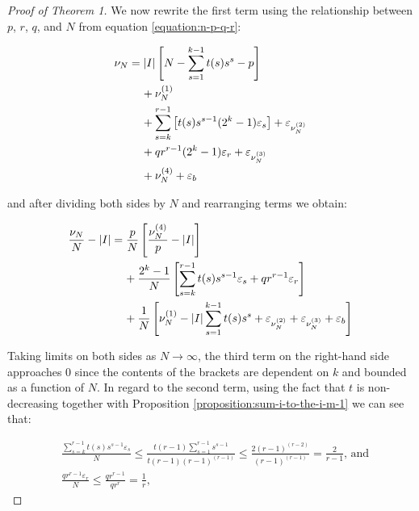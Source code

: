 \documentclass[11pt,a4paper]{tesis}
\theoremstyle{plain}
\theoremstyle{definition}
\begin{document}
\begin{proof}[Proof of Theorem 1]
  We now rewrite the first term using the relationship between $p$, $r$, $q$, and $N$ from equation \ref{equation:n-p-q-r}:

  \begin{equation*}
    \begin{aligned}
      \nu_N
        & = |I| \left[ N - \sum_{s = 1}^{k - 1} t(s) s^s - p \right] \\
        & \hspace*{4mm} + \nu^{(1)}_N \\
        & \hspace*{4mm} + \sum_{s = k}^{r - 1} \left[ t(s) s^{s - 1} (2^k - 1) \varepsilon_s \right] + \varepsilon_{\nu^{(2)}_N} \\
        & \hspace*{4mm} + q r^{r - 1} (2^k - 1) \varepsilon_r  + \varepsilon_{\nu^{(3)}_N} \\
        & \hspace*{4mm} + \nu^{(4)}_N + \varepsilon_b
    \end{aligned}
  \end{equation*}

  and after dividing both sides by $N$ and rearranging terms we obtain:

  \begin{equation*}
    \begin{aligned}
      \frac{\nu_N}{N} - |I|
        & = \frac{p}{N} \left[ \frac{\nu^{(4)}_N}{p} - |I| \right] \\
        & \hspace*{4mm} + \frac{2^k - 1}{N} \left[ \sum_{s = k}^{r - 1} t(s) s^{s - 1} \varepsilon_s + q r^{r - 1} \varepsilon_r \right] \\
        & \hspace*{4mm} + \frac{1}{N} \left[ \nu^{(1)}_N - |I| \sum_{s = 1}^{k - 1} t(s) s^s + \varepsilon_{\nu^{(2)}_N} + \varepsilon_{\nu^{(3)}_N} + \varepsilon_b \right]
    \end{aligned}
  \end{equation*}

  Taking limits on both sides as $N \to \infty$, the third term on the right-hand side approaches $0$ since the contents of the brackets are dependent on $k$ and bounded as a function of $N$. In regard to the second term, using the fact that $t$ is non-decreasing together with Proposition \ref{proposition:sum-i-to-the-i-m-1} we can see that:

  \begin{equation*}
    \begin{aligned}
      & \frac{\sum_{s = k}^{r - 1} t(s) s^{s - 1} \varepsilon_s}{N} \le \frac{t(r - 1) \sum_{s = 1}^{r - 1} s^{s - 1}}{t(r - 1) (r - 1)^{(r - 1)}} \le \frac{2 (r - 1)^{(r - 2)}}{(r - 1)^{(r - 1)}} = \frac{2}{r - 1} \text{, and} \\
      & \frac{q r^{r - 1} \varepsilon_r}{N} \le \frac{q r^{r - 1}}{q r^r} = \frac{1}{r} \text{,}
    \end{aligned}
  \end{equation*}


\end{proof}
\end{document}
